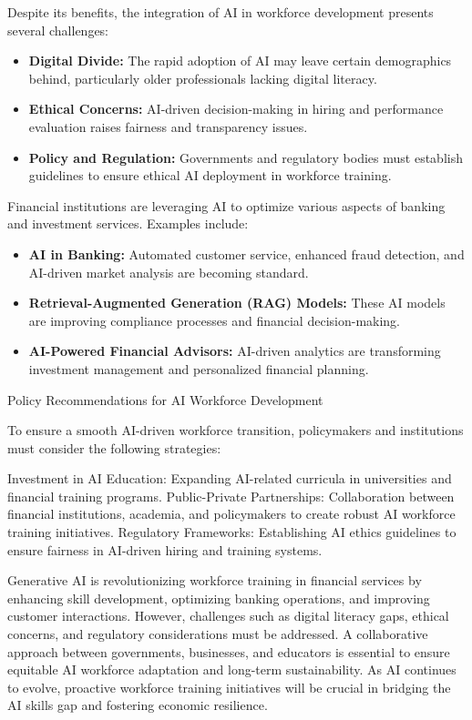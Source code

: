 \documentclass[a4paper,headinclude=on,footinclude=on,12pt,oneside]{scrbook}
\begin{document}

Despite its benefits, the integration of AI in workforce development presents several challenges:
\begin{itemize}
	\item \textbf{Digital Divide:} The rapid adoption of AI may leave certain demographics behind, particularly older professionals lacking digital literacy.
	\item \textbf{Ethical Concerns:} AI-driven decision-making in hiring and performance evaluation raises fairness and transparency issues.
	\item \textbf{Policy and Regulation:} Governments and regulatory bodies must establish guidelines to ensure ethical AI deployment in workforce training.
\end{itemize}


Financial institutions are leveraging AI to optimize various aspects of banking and investment services. Examples include:
\begin{itemize}
	\item \textbf{AI in Banking:} Automated customer service, enhanced fraud detection, and AI-driven market analysis are becoming standard.
	\item \textbf{Retrieval-Augmented Generation (RAG) Models:} These AI models are improving compliance processes and financial decision-making.
	\item \textbf{AI-Powered Financial Advisors:} AI-driven analytics are transforming investment management and personalized financial planning.
\end{itemize}

Policy Recommendations for AI Workforce Development

To ensure a smooth AI-driven workforce transition, policymakers and institutions must consider the following strategies:

Investment in AI Education: Expanding AI-related curricula in universities and financial training programs.
Public-Private Partnerships: Collaboration between financial institutions, academia, and policymakers to create robust AI workforce training initiatives.
Regulatory Frameworks: Establishing AI ethics guidelines to ensure fairness in AI-driven hiring and training systems.



Generative AI is revolutionizing workforce training in financial services by enhancing skill development, optimizing banking operations, and improving customer interactions. However, challenges such as digital literacy gaps, ethical concerns, and regulatory considerations must be addressed. A collaborative approach between governments, businesses, and educators is essential to ensure equitable AI workforce adaptation and long-term sustainability. As AI continues to evolve, proactive workforce training initiatives will be crucial in bridging the AI skills gap and fostering economic resilience.
\end{document}
